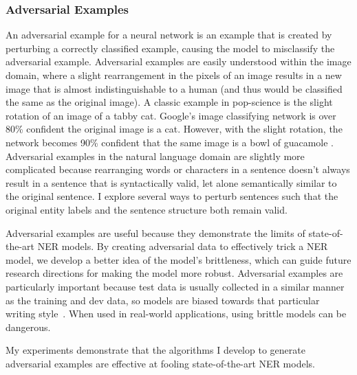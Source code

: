 \subsubsection{Adversarial Examples}
An adversarial example for a neural network is an example that is created by perturbing a correctly classified example, causing the model to misclassify the  adversarial example. Adversarial examples are easily understood within the image domain, where a slight rearrangement in the pixels of an image results in a new image that is almost indistinguishable to a human (and thus would be classified the same as the original image). A classic example in pop-science is the slight rotation of an image of a tabby cat. Google's image classifying network is over 80\% confident the original image is a cat. However, with the slight rotation, the network becomes 90\% confident that the same image is a bowl of guacamole \citep{guacamole}. Adversarial examples in the natural language domain are slightly more complicated because rearranging words or characters in a sentence doesn't always result in a sentence that is syntactically valid, let alone semantically similar to the original sentence. I explore several ways to perturb sentences such that the original entity labels and the sentence structure both remain valid.

Adversarial examples are useful because they demonstrate the limits of state-of-the-art NER models. By creating adversarial data to effectively trick a NER model, we develop a better idea of the model's brittleness, which can guide future research directions for making the model more robust. Adversarial examples are particularly important because test data is usually collected in a similar manner as the training and dev data, so models are biased towards that particular writing style~\citep{SEARs}. When used in real-world applications, using brittle models can be dangerous.

My experiments demonstrate that the algorithms I develop to generate adversarial examples are effective at fooling state-of-the-art NER models.

